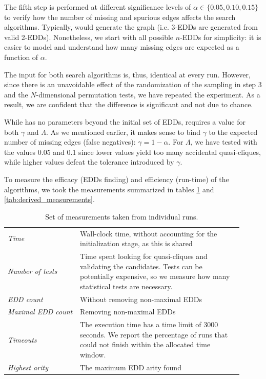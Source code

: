 The fifth step is performed at different significance levels of
$\alpha \in \{0.05, 0.10, 0.15\}$
to verify how the number of missing and spurious edges affects the search algorithms.
Typically, \Mind would generate the graph (i.e. 3-EDDs are generated from valid 2-EDDs).
Nonetheless, we start with all possible $n$-EDDs for simplicity: it is easier to
model and understand how many missing edges are expected as a function of $\alpha$.

The input for both search algorithms is, thus, identical at every run. However, since
there is an unavoidable effect of the randomization of the sampling in step 3 and the
$N$-dimensional permutation tests, we have repeated the experiment.
As a result, we are confident that the difference is significant and not due to chance.

While \Find has no parameters beyond the initial set of \glspl{EDD},
\PresQ requires a value for both $\gamma$ and $\Lambda$. As we mentioned earlier,
it makes sense to bind $\gamma$ to the expected number of missing edges
(false negatives): $\gamma = 1 - \alpha$. For $\Lambda$, we have tested with the
values 0.05 and 0.1 since lower values yield too many accidental quasi-cliques,
while higher values defeat the tolerance introduced by $\gamma$.

To measure the efficacy (\glspl{EDD} finding) and efficiency (run-time) of the algorithms,
we took the measurements summarized in tables \ref{tab:raw_measurements}
and \ref{tab:derived_measurements}.

\begin{table}[tbp]
    \caption{Set of measurements taken from individual runs.}
    \label{tab:raw_measurements}
    \centering
    \begin{tabular}{p{0.28\linewidth} p{0.63\linewidth}}
        \emph{Time}  & Wall-clock time, without accounting for the initialization stage,
                       as this is shared \\
        \emph{Number of tests} & Time spent looking for quasi-cliques and validating the
                                   candidates.
                                   Tests can be potentially expensive, so we measure how many
                                   statistical tests are necessary. \\
        \emph{EDD count} & Without removing non-maximal \glspl{EDD} \\
        \emph{Maximal EDD count} & Removing non-maximal \glspl{EDD} \\
        \emph{Timeouts} & The execution time has a time limit of 3000 seconds. We report the
         percentage of runs that could not finish within the allocated time window. \\
        \emph{Highest arity} & The maximum \gls{EDD} arity found \\
    \end{tabular}
\end{table}

